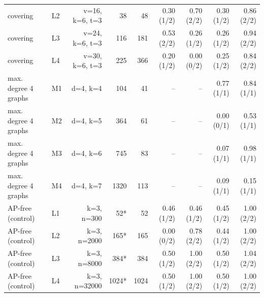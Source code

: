 \begin{tabular}{@{}llrrrrrrr@{}}
covering & L2 & v=16, k=6, t=3 & 38 & 48 & 0.30 (1/2) & 0.70 (2/2) & 0.30 (1/2) & 0.86 (2/2) \\
covering & L3 & v=24, k=6, t=3 & 116 & 181 & 0.53 (2/2) & 0.26 (1/2) & 0.26 (1/2) & 0.94 (2/2) \\
covering & L4 & v=30, k=6, t=3 & 225 & 366 & 0.20 (1/2) & 0.00 (0/2) & 0.25 (1/2) & 0.84 (2/2) \\
max. degree 4 graphs & M1 & d=4, k=4 & 104 & 41 & -- & -- & 0.77 (1/1) & 0.84 (1/1) \\
max. degree 4 graphs & M2 & d=4, k=5 & 364 & 61 & -- & -- & 0.00 (0/1) & 0.53 (1/1) \\
max. degree 4 graphs & M3 & d=4, k=6 & 745 & 83 & -- & -- & 0.07 (1/1) & 0.98 (1/1) \\
max. degree 4 graphs & M4 & d=4, k=7 & 1320 & 113 & -- & -- & 0.09 (1/1) & 0.15 (1/1) \\
AP-free (control) & L1 & k=3, n=300 & 52* & 52 & 0.46 (1/2) & 0.46 (1/2) & 0.45 (1/2) & 1.00 (2/2) \\
AP-free (control) & L2 & k=3, n=2000 & 165* & 165 & 0.00 (0/2) & 0.78 (2/2) & 0.44 (1/2) & 1.00 (2/2) \\
AP-free (control) & L3 & k=3, n=8000 & 384* & 384 & 0.50 (1/2) & 1.00 (2/2) & 0.50 (1/2) & 1.04 (2/2) \\
AP-free (control) & L4 & k=3, n=32000 & 1024* & 1024 & 0.50 (1/2) & 1.00 (2/2) & 0.50 (1/2) & 1.00 (2/2) \\
\bottomrule
\end{tabular}
